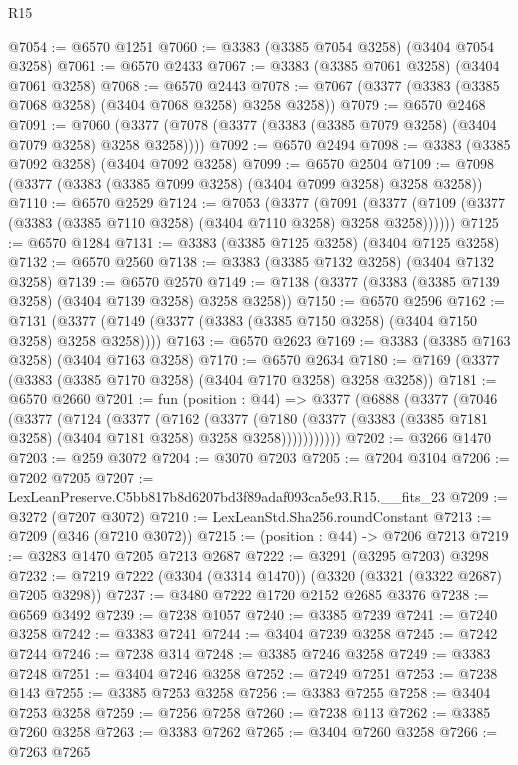 \begin{lexlean}{R15}
\begin{coremodule}
@7054 := @6570 @1251
@7060 := @3383 (@3385 @7054 @3258) (@3404 @7054 @3258)
@7061 := @6570 @2433
@7067 := @3383 (@3385 @7061 @3258) (@3404 @7061 @3258)
@7068 := @6570 @2443
@7078 := @7067 (@3377 (@3383 (@3385 @7068 @3258) (@3404 @7068 @3258) @3258 @3258))
@7079 := @6570 @2468
@7091 := @7060 (@3377 (@7078 (@3377 (@3383 (@3385 @7079 @3258) (@3404 @7079 @3258) @3258 @3258))))
@7092 := @6570 @2494
@7098 := @3383 (@3385 @7092 @3258) (@3404 @7092 @3258)
@7099 := @6570 @2504
@7109 := @7098 (@3377 (@3383 (@3385 @7099 @3258) (@3404 @7099 @3258) @3258 @3258))
@7110 := @6570 @2529
@7124 := @7053
    (@3377
      (@7091 (@3377 (@7109 (@3377 (@3383 (@3385 @7110 @3258) (@3404 @7110 @3258) @3258 @3258))))))
@7125 := @6570 @1284
@7131 := @3383 (@3385 @7125 @3258) (@3404 @7125 @3258)
@7132 := @6570 @2560
@7138 := @3383 (@3385 @7132 @3258) (@3404 @7132 @3258)
@7139 := @6570 @2570
@7149 := @7138 (@3377 (@3383 (@3385 @7139 @3258) (@3404 @7139 @3258) @3258 @3258))
@7150 := @6570 @2596
@7162 := @7131 (@3377 (@7149 (@3377 (@3383 (@3385 @7150 @3258) (@3404 @7150 @3258) @3258 @3258))))
@7163 := @6570 @2623
@7169 := @3383 (@3385 @7163 @3258) (@3404 @7163 @3258)
@7170 := @6570 @2634
@7180 := @7169 (@3377 (@3383 (@3385 @7170 @3258) (@3404 @7170 @3258) @3258 @3258))
@7181 := @6570 @2660
@7201 := fun (position : @44) =>
  @3377
    (@6888
      (@3377
        (@7046
          (@3377
            (@7124
              (@3377
                (@7162
                  (@3377
                    (@7180
                      (@3377 (@3383 (@3385 @7181 @3258) (@3404 @7181 @3258) @3258 @3258)))))))))))
@7202 := @3266 @1470
@7203 := @259 @3072
@7204 := @3070 @7203
@7205 := @7204 @3104
@7206 := @7202 @7205
@7207 := LexLeanPreserve.C5bb817b8d6207bd3f89adaf093ca5e93.R15.__fits_23
@7209 := @3272 (@7207 @3072)
@7210 := LexLeanStd.Sha256.roundConstant
@7213 := @7209 (@346 (@7210 @3072))
@7215 := (position : @44) -> @7206 @7213
@7219 := @3283 @1470 @7205 @7213 @2687
@7222 := @3291 (@3295 @7203) @3298
@7232 := @7219 @7222 (@3304 (@3314 @1470)) (@3320 (@3321 (@3322 @2687) @7205 @3298))
@7237 := @3480 @7222 @1720 @2152 @2685 @3376
@7238 := @6569 @3492
@7239 := @7238 @1057
@7240 := @3385 @7239
@7241 := @7240 @3258
@7242 := @3383 @7241
@7244 := @3404 @7239 @3258
@7245 := @7242 @7244
@7246 := @7238 @314
@7248 := @3385 @7246 @3258
@7249 := @3383 @7248
@7251 := @3404 @7246 @3258
@7252 := @7249 @7251
@7253 := @7238 @143
@7255 := @3385 @7253 @3258
@7256 := @3383 @7255
@7258 := @3404 @7253 @3258
@7259 := @7256 @7258
@7260 := @7238 @113
@7262 := @3385 @7260 @3258
@7263 := @3383 @7262
@7265 := @3404 @7260 @3258
@7266 := @7263 @7265

\end{coremodule}
\end{lexlean}
